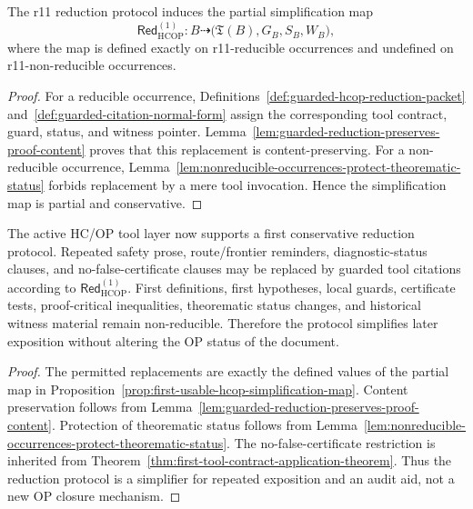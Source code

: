 \begin{proposition}
\label{prop:first-usable-hcop-simplification-map}
The r11 reduction protocol induces the partial simplification map
\[
  \mathsf{Red}_{\mathrm{HCOP}}^{(1)}:
  B
  \dashrightarrow
  \bigl(\mathfrak T(B),G_B,S_B,W_B\bigr),
\]
where the map is defined exactly on r11-reducible occurrences and undefined on r11-non-reducible occurrences.
\end{proposition}

\begin{proof}
For a reducible occurrence, Definitions~\ref{def:guarded-hcop-reduction-packet} and~\ref{def:guarded-citation-normal-form} assign the corresponding tool contract, guard, status, and witness pointer. Lemma~\ref{lem:guarded-reduction-preserves-proof-content} proves that this replacement is content-preserving. For a non-reducible occurrence, Lemma~\ref{lem:nonreducible-occurrences-protect-theorematic-status} forbids replacement by a mere tool invocation. Hence the simplification map is partial and conservative.
\end{proof}

\begin{theorem}
\label{thm:first-tool-guarded-hcop-reduction-theorem}
The active HC/OP tool layer now supports a first conservative reduction protocol. Repeated safety prose, route/frontier reminders, diagnostic-status clauses, and no-false-certificate clauses may be replaced by guarded tool citations according to \(\mathsf{Red}_{\mathrm{HCOP}}^{(1)}\). First definitions, first hypotheses, local guards, certificate tests, proof-critical inequalities, theorematic status changes, and historical witness material remain non-reducible. Therefore the protocol simplifies later exposition without altering the OP status of the document.
\end{theorem}

\begin{proof}
The permitted replacements are exactly the defined values of the partial map in Proposition~\ref{prop:first-usable-hcop-simplification-map}. Content preservation follows from Lemma~\ref{lem:guarded-reduction-preserves-proof-content}. Protection of theorematic status follows from Lemma~\ref{lem:nonreducible-occurrences-protect-theorematic-status}. The no-false-certificate restriction is inherited from Theorem~\ref{thm:first-tool-contract-application-theorem}. Thus the reduction protocol is a simplifier for repeated exposition and an audit aid, not a new OP closure mechanism.
\end{proof}


